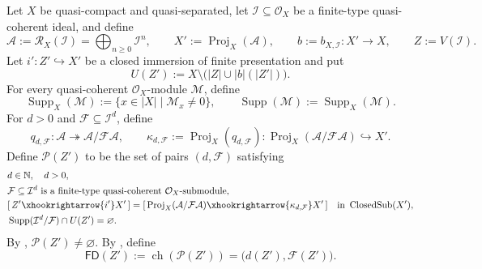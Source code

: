 \begin{definition}
  \label{def:nagata-proj-closed-center-finite-degree}
  \lean{}

  Let $X$ be quasi-compact and quasi-separated, let
  $\mathcal I\subseteq\mathcal O_X$ be a finite-type quasi-coherent ideal,
  and define
  \[
    \mathcal A:=\mathcal R_X(\mathcal I)
      =\bigoplus_{n\ge0}\mathcal I^n,\qquad
    X':=\operatorname{Proj}_X(\mathcal A),\qquad
    b:=b_{X,\mathcal I}\colon X'\to X,\qquad
    Z:=V(\mathcal I).
  \]
  Let $i'\colon Z'\hookrightarrow X'$ be a closed immersion of finite
  presentation and put
  \[
    U(Z'):=X\setminus\bigl(|Z|\cup |b|(|Z'|)\bigr).
  \]
  For every quasi-coherent $\mathcal O_X$-module $\mathcal M$, define
  \[
    \operatorname{Supp}_X(\mathcal M)
      :=\{x\in|X|\mid\mathcal M_x\neq0\},
    \qquad
    \operatorname{Supp}(\mathcal M):=
      \operatorname{Supp}_X(\mathcal M).                           \tag{FD0}
  \]
  For $d>0$ and
  $\mathcal F\subseteq\mathcal I^d$, define
  \[
    q_{d,\mathcal F}\colon\mathcal A\twoheadrightarrow
      \mathcal A/\mathcal F\mathcal A,
    \qquad
    \kappa_{d,\mathcal F}:=
      \operatorname{Proj}_X(q_{d,\mathcal F})\colon
      \operatorname{Proj}_X(\mathcal A/\mathcal F\mathcal A)
        \hookrightarrow X'.                                      \tag{FD1}
  \]
  Define $\mathcal P(Z')$ to be the set of pairs $(d,\mathcal F)$ satisfying
  \[
  \begin{aligned}
    &d\in\mathbb N,\quad d>0,\\
    &\mathcal F\subseteq\mathcal I^d
      \text{ is a finite-type quasi-coherent }\mathcal O_X\text{-submodule},\\
    &[\,Z'\xhookrightarrow{i'}X'\,]
      =[\,\operatorname{Proj}_X
        (\mathcal A/\mathcal F\mathcal A)
        \xhookrightarrow{\kappa_{d,\mathcal F}}X'\,]
      \quad\text{in }\operatorname{ClosedSub}(X'),\\
    &\operatorname{Supp}(\mathcal I^d/\mathcal F)\cap U(Z')=\varnothing.
  \end{aligned}
  \]
  By \cite[Tag 0803]{stacks-project}, $\mathcal P(Z')\ne\varnothing$.  By
  , define
  \[
    \mathsf{FD}(Z'):=
      \operatorname{ch}(\mathcal P(Z'))
      =\bigl(d(Z'),\mathcal F(Z')\bigr).
  \]
\end{definition}

